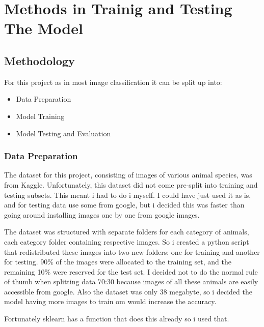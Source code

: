 \chapter{Methods in Trainig and Testing The Model}

\section{Methodology}
For this project as in most image classification it can be split up into:
\begin{itemize}
    \item Data Preparation
    \item Model Training
    \item Model Testing and Evaluation
\end{itemize}

\subsection{Data Preparation}
The dataset for this project, consisting of images of various animal species, was  from Kaggle. Unfortunately, this dataset did not come pre-split into training and testing subsets. This meant i had to do i myself. I could have just used it as is, and for testing data use some from google, but i decided this was faster than going around installing images one by one from google images.


The dataset was structured with separate folders for each category of animals, each category folder containing respective images. So i created a python script that redistributed these images into two new folders: one for training and another for testing. 90\% of the images were allocated to the training set, and the remaining 10\% were reserved for the test set. I decided not to do the normal rule of thumb when splitting data 70:30 because images of all these animals are easily accessible from google. Also the dataset was only 38 megabyte, so i decided the model having more images to train om would increase the accuracy.

Fortunately sklearn has a function that does this already so i used that. 

